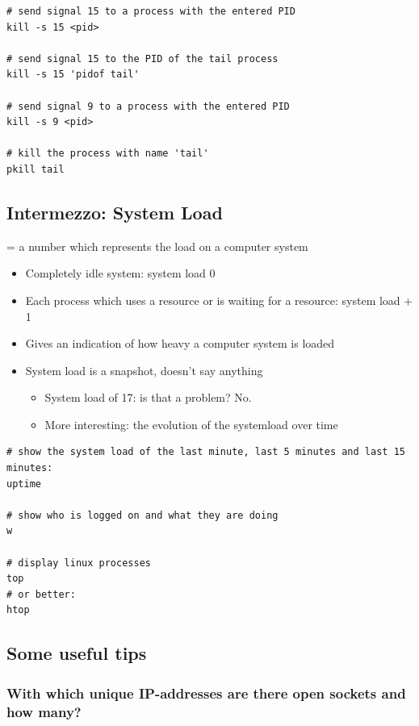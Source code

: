 \documentclass{article}
\begin{document}
\begin{verbatim}
# send signal 15 to a process with the entered PID
kill -s 15 <pid>

# send signal 15 to the PID of the tail process
kill -s 15 'pidof tail'

# send signal 9 to a process with the entered PID
kill -s 9 <pid>

# kill the process with name 'tail'
pkill tail
\end{verbatim}


\subsection{Intermezzo: System Load}

= a number which represents the load on a computer system

\begin{itemize}
    \item Completely idle system: system load 0
    \item Each process which uses a resource or is waiting for a resource: system load + 1
    \item Gives an indication of how heavy a computer system is loaded
    \item System load is a snapshot, doesn't say anything
    \begin{itemize}
        \item System load of 17: is that a problem? No.
        \item More interesting: the evolution of the systemload over time
    \end{itemize} 
\end{itemize}

\begin{verbatim}
# show the system load of the last minute, last 5 minutes and last 15 minutes:
uptime

# show who is logged on and what they are doing
w

# display linux processes
top
# or better:
htop
\end{verbatim}

\subsection{Some useful tips}

\subsubsection{With which unique IP-addresses are there open sockets and how many?}
\end{document}

